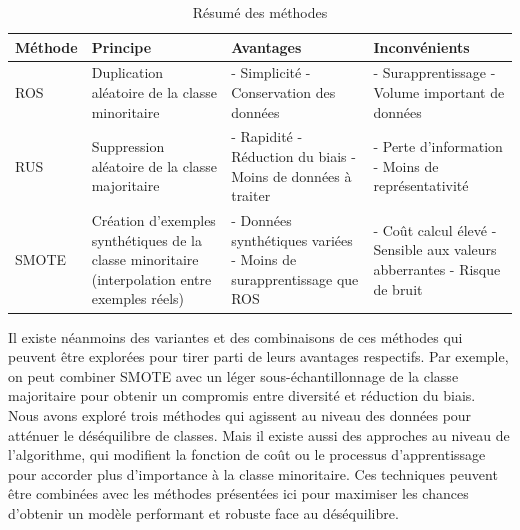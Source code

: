\documentclass{article}
\begin{document}
\begin{table}[h!]
\centering
\begin{tabular}{|p{1.5cm}|p{4cm}|p{4.5cm}|p{4.2cm}|}
\hline

\centering
\textbf{Méthode} & \textbf{Principe} & \textbf{Avantages} & \textbf{Inconvénients} \\ \hline

\centering
ROS &
Duplication aléatoire de la classe minoritaire &
- Simplicité \newline
- Conservation des données &
- Surapprentissage \newline
- Volume important de \newline données \\ \hline


\centering
RUS &
Suppression aléatoire de la classe majoritaire &
- Rapidité \newline
- Réduction du biais \newline
- Moins de données à traiter &
- Perte d’information \newline
- Moins de représentativité \\ \hline

\centering
SMOTE &
Création d'exemples synthétiques de la classe minoritaire (interpolation entre exemples réels) &
- Données synthétiques \newline variées \newline
- Moins de surapprentissage que ROS &
- Coût calcul élevé \newline
- Sensible aux valeurs \newline abberrantes \newline
- Risque de bruit \\ \hline
\end{tabular}
\caption{Résumé des méthodes}\label{tab:methode}
\end{table}

Il existe néanmoins des variantes et des combinaisons de ces méthodes qui peuvent être explorées pour tirer parti de leurs avantages respectifs. Par exemple, on peut combiner SMOTE avec un léger sous-échantillonnage de la classe majoritaire pour obtenir un compromis entre diversité et réduction du biais.
\\
Nous avons exploré trois méthodes qui agissent au niveau des données pour atténuer le déséquilibre de classes. Mais il existe aussi des approches au niveau de l’algorithme, qui modifient la fonction de coût ou le processus d’apprentissage pour accorder plus d’importance à la classe minoritaire. Ces techniques peuvent être combinées avec les méthodes présentées ici pour maximiser les chances d’obtenir un modèle performant et robuste face au déséquilibre.
\end{document}
